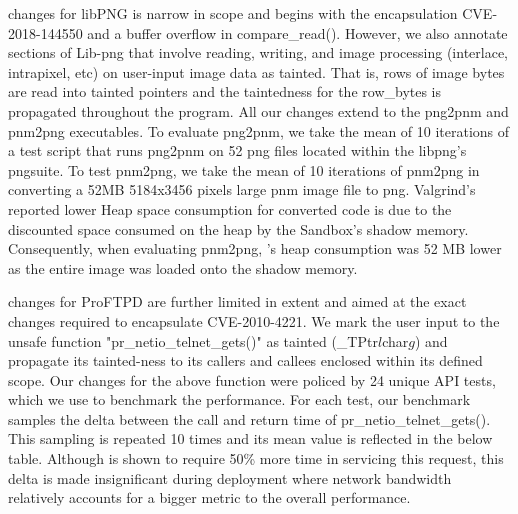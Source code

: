 \systemname changes for libPNG is narrow in scope and begins with the encapsulation CVE-2018-144550 and a buffer overflow in compare\_read(). However, we also annotate sections of Lib-png that involve reading, writing, and image processing (interlace, intrapixel, etc) on user-input image data as tainted. That is, rows of image bytes are read into tainted pointers and the taintedness for the row\_bytes is propagated throughout the program. All our changes extend to the png2pnm and pnm2png executables. To evaluate png2pnm, we take the mean of 10 iterations of a test script that runs png2pnm on 52 png files located within the libpng's pngsuite. To test pnm2png, we take the mean of 10 iterations of pnm2png in converting a 52MB 5184x3456 pixels large pnm image file to png. Valgrind's reported lower Heap space consumption for \systemname converted code is due to the discounted space consumed on the heap by the Sandbox's shadow memory. Consequently, when evaluating pnm2png, \systemname's heap consumption was 52 MB lower as the entire image was loaded onto the shadow memory.  

\systemname changes for ProFTPD are further limited in extent and aimed at the exact changes required to encapsulate CVE-2010-4221. We mark the user input to the unsafe function "pr\_netio\_telnet\_gets()" as tainted (\_TPtr$l$char$g$) and propagate its tainted-ness to its callers and callees enclosed within its defined scope. Our changes for the above function were policed by 24 unique API tests, which we use to benchmark the performance. For each test, our benchmark samples the delta between the call and return time of pr\_netio\_telnet\_gets(). This sampling is repeated 10 times and its mean value is reflected in the below table. Although \systemname is shown to require 50\% more time in servicing this request, this delta is made insignificant during deployment where network bandwidth relatively accounts for a bigger metric to the overall performance.

